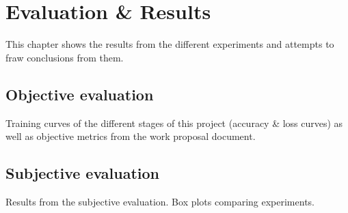 \chapter{Evaluation \& Results}

This chapter shows the results from the different experiments and attempts to fraw conclusions from them.

\section{Objective evaluation}

Training curves of the different stages of this project (accuracy \& loss curves) as well as objective metrics from  the work proposal document.

\section{Subjective evaluation}

Results from the subjective evaluation. Box plots comparing experiments.
